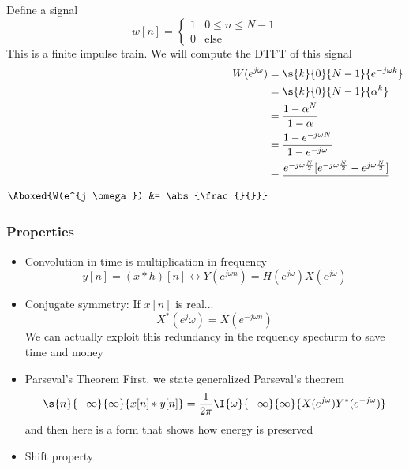 \documentclass{report}
\begin{document}
\theoremstyle{definition}
\begin{example}
    Define a signal
    \begin{equation*}
        w[n] = \begin{cases}
            1 & 0 \leq n \leq N - 1 \\
            0 & \text{else}
        \end{cases}
    \end{equation*}
    This is a finite impulse train.
    We will compute the DTFT of this signal
    \begin{align*}
        W(e^{j\omega}) &= \s{k}{0}{N - 1}{e^{-j \omega k}} \\
        &= \s{k}{0}{N - 1}{\alpha^k} \\
        &= \frac{1 - \alpha^N}{1 - \alpha} \\
        &= \frac{1 - e^{-j \omega N}}{1 - e^{- j \omega}} \\
        &= \frac{e^{-j \omega \frac{N}{2}} [e^{-j \omega \frac{N}{2}} - e^{j \omega \frac{N}{2}}]}{} \\
        \Aboxed{W(e^{j \omega}) &= \abs{\frac{}{}}}
    \end{align*}
\end{example}
\subsubsection{Properties}
\begin{itemize}
    \item Convolution in time is multiplication in frequency
    \begin{equation*}
        y[n] = (x * h)[n] \leftrightarrow Y(e^{j \omega n}) = H(e^{j \omega}) X(e^{j \omega})
    \end{equation*}
    \item Conjugate symmetry: If $x[n]$ is real...
    \begin{equation*}
        X^*(e^j \omega) = X(e^{- j \omega n})
    \end{equation*}
    We can actually exploit this redundancy in the requency specturm to save time and money
    \item Parseval's Theorem
    First, we state generalized Parseval's theorem
    \begin{equation*}
        \s{n}{-\infty}{\infty}{x[n] * y[n]} = \frac{1}{2 \pi} \I{\omega}{-\infty}{\infty}{X(e^{j \omega}) Y^*({e ^{- j \omega}})}
    \end{equation*}
    and then here is a form that shows how energy is preserved
    \item Shift property
\end{itemize}
\end{document}
